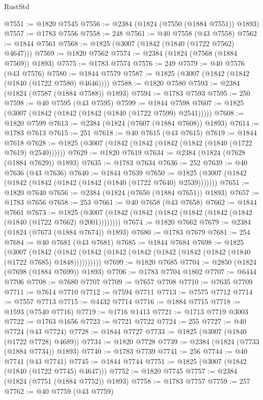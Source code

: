 \begin{lexlean}{RustStd}
\begin{coremodule}
@7551 := @1820 @7545
@7556 := @2384 (@1824 (@7550 (@1884 @7551)) @1893)
@7557 := @1783 @7556
@7558 := 248
@7561 := @40 @7558 (@43 @7558)
@7562 := @1844 @7561
@7568 := @1825 (@3007 (@1842 (@1840 (@1722 @7562) @4647)))
@7569 := @1820 @7562
@7574 := @2384 (@1824 (@7568 (@1884 @7569)) @1893)
@7575 := @1783 @7574
@7576 := 249
@7579 := @40 @7576 (@43 @7576)
@7580 := @1844 @7579
@7587 := @1825 (@3007 (@1842 (@1842 (@1840 (@1722 @7580) @4646))))
@7588 := @1820 @7580
@7593 := @2384 (@1824 (@7587 (@1884 @7588)) @1893)
@7594 := @1783 @7593
@7595 := 250
@7598 := @40 @7595 (@43 @7595)
@7599 := @1844 @7598
@7607 := @1825 (@3007 (@1842 (@1842 (@1842 (@1840 (@1722 @7599) @2541)))))
@7608 := @1820 @7599
@7613 := @2384 (@1824 (@7607 (@1884 @7608)) @1893)
@7614 := @1783 @7613
@7615 := 251
@7618 := @40 @7615 (@43 @7615)
@7619 := @1844 @7618
@7628 := @1825 (@3007 (@1842 (@1842 (@1842 (@1842 (@1840 (@1722 @7619) @2540))))))
@7629 := @1820 @7619
@7634 := @2384 (@1824 (@7628 (@1884 @7629)) @1893)
@7635 := @1783 @7634
@7636 := 252
@7639 := @40 @7636 (@43 @7636)
@7640 := @1844 @7639
@7650 := @1825 (@3007 (@1842 (@1842 (@1842 (@1842 (@1842 (@1840 (@1722 @7640) @2539)))))))
@7651 := @1820 @7640
@7656 := @2384 (@1824 (@7650 (@1884 @7651)) @1893)
@7657 := @1783 @7656
@7658 := 253
@7661 := @40 @7658 (@43 @7658)
@7662 := @1844 @7661
@7673 := @1825 (@3007 (@1842 (@1842 (@1842 (@1842 (@1842 (@1842 (@1840 (@1722 @7662) @2001))))))))
@7674 := @1820 @7662
@7679 := @2384 (@1824 (@7673 (@1884 @7674)) @1893)
@7680 := @1783 @7679
@7681 := 254
@7684 := @40 @7681 (@43 @7681)
@7685 := @1844 @7684
@7698 := @1825
    (@3007
      (@1842 (@1842 (@1842 (@1842 (@1842 (@1842 (@1842 (@1842 (@1840 (@1722 @7685) @1848))))))))))
@7699 := @1820 @7685
@7704 := @2850 (@1824 (@7698 (@1884 @7699)) @1893)
@7706 := @1783 @7704 @1802
@7707 := @6444 @7706
@7708 := @7680 @7707
@7709 := @7657 @7708
@7710 := @7635 @7709
@7711 := @7614 @7710
@7712 := @7594 @7711
@7713 := @7575 @7712
@7714 := @7557 @7713
@7715 := @4432 @7714
@7716 := @1884 @7715
@7718 := @1593 (@7540 @7716)
@7719 := @1716 @1413
@7721 := @1713 @7719 @3003
@7722 := @1763 @1656
@7723 := @7721 @7722
@7724 := 255
@7727 := @40 @7724 (@43 @7724)
@7728 := @1844 @7727
@7733 := @1825 (@3007 (@1840 (@1722 @7728) @4689))
@7734 := @1820 @7728
@7739 := @2384 (@1824 (@7733 (@1884 @7734)) @1893)
@7740 := @1783 @7739
@7741 := 256
@7744 := @40 @7741 (@43 @7741)
@7745 := @1844 @7744
@7751 := @1825 (@3007 (@1842 (@1840 (@1722 @7745) @4647)))
@7752 := @1820 @7745
@7757 := @2384 (@1824 (@7751 (@1884 @7752)) @1893)
@7758 := @1783 @7757
@7759 := 257
@7762 := @40 @7759 (@43 @7759)

\end{coremodule}
\end{lexlean}
